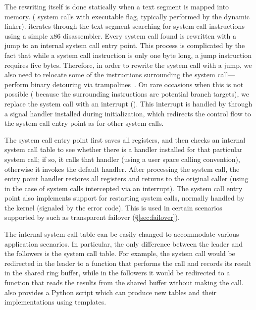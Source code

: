 The rewriting itself is done statically when a text segment is mapped into
memory.  (\ie {} system calls with executable flag, typically performed
by the dynamic linker).  \nx iterates through the text segment searching for
system call instructions using a simple x86 disassembler. Every system call
found is rewritten with a jump to an internal system call entry point. This
process is complicated by the fact that while a system call instruction is only
one byte long, a jump instruction requires five bytes. Therefore, in order to
rewrite the system call with a jump, we also need to relocate some of the
instructions surrounding the system call---\ie perform binary detouring via
trampolines~\cite{detours}.  On rare occasions when this is not possible (\eg
because the surrounding instructions are potential branch targets), we replace
the system call with an interrupt ().  This interrupt is handled
by \nx through a signal handler installed during initialization, which
redirects the control flow to the system call entry point as for other system
calls.

The system call entry point first saves all registers, and then checks an
internal system call table to see whether there is a handler installed for that
particular system call; if so, it calls that handler (using a user space
calling convention), otherwise it invokes the default handler.  After
processing the system call, the entry point handler restores all registers and
returns to the original caller (using  in the case of system
calls intercepted via an interrupt). The system call entry point also
implements support for restarting system calls, normally handled by the kernel
(\ie signaled by the  error code). This is used in certain
scenarios supported by \nx such as transparent failover (\S\ref{sec:failover}).

The internal system call table can be easily changed to accommodate
various application scenarios.  In particular, the only difference
between the leader and the followers is the system call table. For
example, the  system call would be redirected in the leader
to a function that performs the call and records its result in the
shared ring buffer, while in the followers it would be redirected to a
function that reads the results from the shared buffer without making
the call.
\varan  also provides a Python script which can produce new tables
and their implementations using templates.


